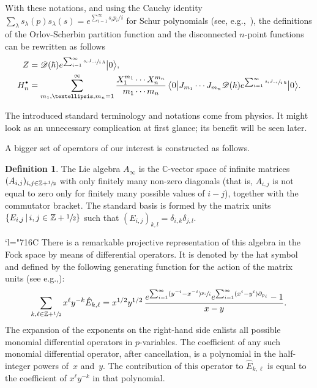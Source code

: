 \documentclass[11pt]{article}
\newcommand{\eg}{e.g.,\xspace}
\let\mathcal\mathscr
\newcommand{\sbullet}{{\scriptscriptstyle\bullet}}
\newcommand{\csbullet}{{\raisebox{1pt}{$\sbullet$}}}
\newcommand{\Changelback}{\mathcode`l="716C}
\newcommand{\C}{\mathbb{C}}
\theoremstyle{plain}
\theoremstyle{definition}
\newtheorem{definition}[theorem]{Definition}
\theoremstyle{remark}
\newcommand{\Z}{\mathbb{Z}}
\newcommand{\VEV}[1]{{\bigl\langle 0 \big| {#1} \big| 0 \bigr\rangle}}
\newcommand{\Hd}{H^\csbullet}
\begin{document}
With these notations, and using the Cauchy identity $\sum_\lambda s_\lambda(p)s_\lambda(s)=e^{\sum_{i=1}^\infty s_ip_i/i}$ for Schur polynomials (see, e.g.,~\cite[p.\,386]{Stanley}), the definitions of the Orlov-Scherbin partition function and the disconnected $n$-point functions can be rewritten as follows
\begin{align}
Z&=\mathcal{D}(\hbar)e^{\sum_{i=1}^\infty \sfrac{s_iJ_{-i}}{i\,\hbar}}\big|0\big\rangle,\notag\\
\Hd_n&=\sum_{m_1,\dots,m_n=1}^\infty \frac{X_1^{m_1}\cdots X_n^{m_n}}{m_1\cdots m_n}\,
\VEV{J_{m_1}\cdots J_{m_n}\mathcal{D}(\hbar)e^{\sum_{i=1}^\infty \sfrac{s_iJ_{-i}}{i\,\hbar}}}.\label{eq:Hd}
\end{align}

The introduced standard terminology and notations come from physics. It might look as an unnecessary complication at first glance; its benefit will be seen later.

A bigger set of operators of our interest is constructed as follows.

\begin{definition}
The Lie algebra $A_\infty$ is the $\C$-vector space of infinite matrices $(A_{i,j})_{i,j\in \Z+\sfrac{1}{2}}$ with
only finitely many non-zero diagonals (that is, $A_{i,j}$ is not equal to zero only for finitely
many possible values of $i-j$), together with the commutator bracket. The standard basis is formed by the matrix units $\{E_{i,j}\,|\, i,j \in \Z+\sfrac{1}{2}\}$ such that $(E_{i,j})_{k,l} = \delta_{i,k}\delta_{j,l}$.
\end{definition}

\Changelback
There is a remarkable projective representation of this algebra in the Fock space by means of differential operators. It is denoted by the hat symbol and defined by the following generating function for the action of the matrix units (see \eg \cite[\S 6.2]{MiwaJimboDate}):
\begin{equation}\label{eq:A-action}
\sum_{k,\ell\in\Z+\sfrac{1}{2}}x^{\ell} y^{-k} \hat E_{k,\ell}=
x^{1/2}y^{1/2}\,\frac{
e^{\sum_{i=1}^\infty (y^{-i}-x^{-i}) \sfrac{p_i}{i} }
e^{\sum_{i=1}^\infty (x^i-y^i)\partial_{p_i}}-1}
{x-y}.
\end{equation}
The expansion of the exponents on the right-hand side enlists all possible monomial differential operators in $p$-variables. The coefficient of any such monomial differential operator, after cancellation, is a polynomial in the half-integer powers of~$x$ and~$y$. The contribution of this operator to $\hat E_{k,\ell}$ is equal to the coefficient of
$x^{\ell} y^{-k}$ in that polynomial.
\end{document}
